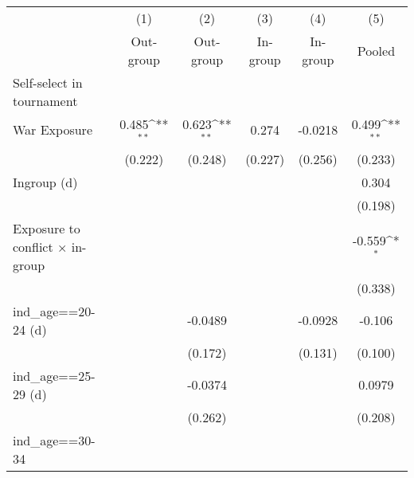 {
\def\sym#1{\ifmmode^{#1}\else\(^{#1}\)\fi}
\begin{tabular}{l*{5}{c}}
\hline\hline
                    &\multicolumn{1}{c}{(1)}&\multicolumn{1}{c}{(2)}&\multicolumn{1}{c}{(3)}&\multicolumn{1}{c}{(4)}&\multicolumn{1}{c}{(5)}\\
                    &\multicolumn{1}{c}{Out-group}&\multicolumn{1}{c}{Out-group}&\multicolumn{1}{c}{In-group}&\multicolumn{1}{c}{In-group}&\multicolumn{1}{c}{Pooled}\\
\hline
Self-select in tournament&                     &                     &                     &                     &                     \\
War Exposure        &       0.485\sym{**} &       0.623\sym{**} &       0.274         &     -0.0218         &       0.499\sym{**} \\
                    &     (0.222)         &     (0.248)         &     (0.227)         &     (0.256)         &     (0.233)         \\
[1em]
Ingroup (d)         &                     &                     &                     &                     &       0.304         \\
                    &                     &                     &                     &                     &     (0.198)         \\
[1em]
Exposure to conflict × in-group&                     &                     &                     &                     &      -0.559\sym{*}  \\
                    &                     &                     &                     &                     &     (0.338)         \\
[1em]
ind\_age==20-24 (d)  &                     &     -0.0489         &                     &     -0.0928         &      -0.106         \\
                    &                     &     (0.172)         &                     &     (0.131)         &     (0.100)         \\
[1em]
ind\_age==25-29 (d)  &                     &     -0.0374         &                     &                     &      0.0979         \\
                    &                     &     (0.262)         &                     &                     &     (0.208)         \\
[1em]
ind\_age==30-34      &                     &                     &                     &                     &                     \\

\end{tabular}}
